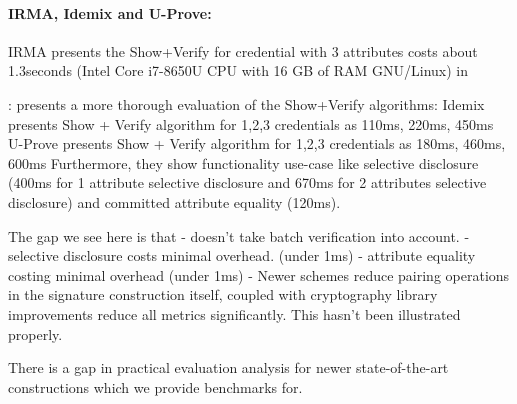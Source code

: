 \paragraph{IRMA, Idemix and U-Prove: }

IRMA \cite{fischer-hubner_towards_2013} presents the Show+Verify for credential with 3 attributes costs about 1.3seconds (Intel Core i7-8650U CPU with 16 GB of RAM GNU/Linux) in \cite{zhang_passo_2021}

\cite{habib_evaluation_2016}: presents a more thorough evaluation of the Show+Verify algorithms:
Idemix presents Show + Verify algorithm for 1,2,3 credentials as 110ms, 220ms, 450ms
U-Prove presents Show + Verify algorithm for 1,2,3 credentials as 180ms, 460ms, 600ms
Furthermore, they show functionality use-case like selective disclosure (400ms for 1 attribute selective disclosure and 670ms for 2 attributes selective disclosure) and committed attribute equality (120ms). 

The gap we see here is that 
- doesn't take batch verification into account.
- selective disclosure costs minimal overhead. (under 1ms)
- attribute equality costing minimal overhead (under 1ms)
- Newer schemes \cite{camenisch_anonymous_2016, tomescu_utt_2022} reduce pairing operations in the signature construction itself, coupled with cryptography library improvements reduce all metrics significantly. 
This hasn't been illustrated properly. 

There is a gap in practical evaluation analysis for newer state-of-the-art constructions which we provide benchmarks for.
















